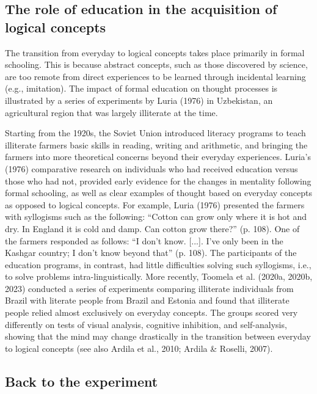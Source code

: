 \documentclass[authordate, empirical]{jote-new-article}
\begin{document}
	\subsection{The role of education in the acquisition of logical concepts}



	The transition from everyday to logical concepts takes place primarily in formal schooling. This is because abstract concepts, such as those discovered by science, are too remote from direct experiences to be learned through incidental learning (e.g., imitation). The impact of formal education on thought processes is illustrated by a series of experiments by Luria (1976) in Uzbekistan, an agricultural region that was largely illiterate at the time.



	Starting from the 1920s, the Soviet Union introduced literacy programs to teach illiterate farmers basic skills in reading, writing and arithmetic, and bringing the farmers into more theoretical concerns beyond their everyday experiences. Luria's (1976) comparative research on individuals who had received education versus those who had not, provided early evidence for the changes in mentality following formal schooling, as well as clear examples of thought based on everyday concepts as opposed to logical concepts. For example, Luria (1976) presented the farmers with syllogisms such as the following: “Cotton can grow only where it is hot and dry. In England it is cold and damp. Can cotton grow there?” (p. 108). One of the farmers responded as follows: “I don't know. [...]. I've only been in the Kashgar country; I don't know beyond that” (p. 108). The participants of the education programs, in contrast, had little difficulties solving such syllogisms, i.e., to solve problems intra-linguistically. More recently, Toomela et al. (2020a, 2020b, 2023) conducted a series of experiments comparing illiterate individuals from Brazil with literate people from Brazil and Estonia and found that illiterate people relied almost exclusively on everyday concepts. The groups scored very differently on tests of visual analysis, cognitive inhibition, and self-analysis, showing that the mind may change drastically in the transition between everyday to logical concepts (see also Ardila et al., 2010; Ardila \& Roselli, 2007).



	\subsection{Back to the experiment}
\end{document}
